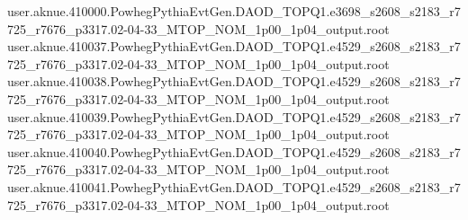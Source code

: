 {user.aknue.410000.PowhegPythiaEvtGen.DAOD_TOPQ1.e3698_s2608_s2183_r7725_r7676_p3317.02-04-33_MTOP_NOM_1p00_1p04_output.root\\
user.aknue.410037.PowhegPythiaEvtGen.DAOD_TOPQ1.e4529_s2608_s2183_r7725_r7676_p3317.02-04-33_MTOP_NOM_1p00_1p04_output.root\\
user.aknue.410038.PowhegPythiaEvtGen.DAOD_TOPQ1.e4529_s2608_s2183_r7725_r7676_p3317.02-04-33_MTOP_NOM_1p00_1p04_output.root\\
user.aknue.410039.PowhegPythiaEvtGen.DAOD_TOPQ1.e4529_s2608_s2183_r7725_r7676_p3317.02-04-33_MTOP_NOM_1p00_1p04_output.root\\
user.aknue.410040.PowhegPythiaEvtGen.DAOD_TOPQ1.e4529_s2608_s2183_r7725_r7676_p3317.02-04-33_MTOP_NOM_1p00_1p04_output.root\\
user.aknue.410041.PowhegPythiaEvtGen.DAOD_TOPQ1.e4529_s2608_s2183_r7725_r7676_p3317.02-04-33_MTOP_NOM_1p00_1p04_output.root\\

}


